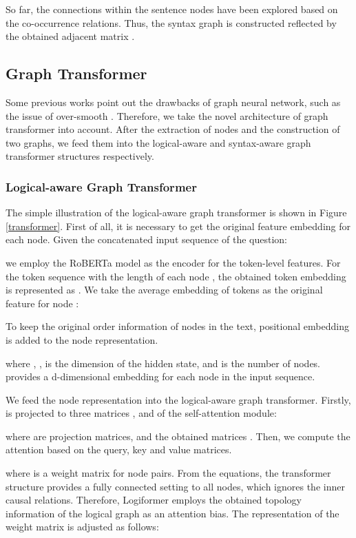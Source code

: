 \documentclass[sigconf]{acmart}
\begin{document}
So far, the connections within the sentence nodes have been explored based on the co-occurrence relations. Thus, the syntax graph is constructed reflected by the obtained adjacent matrix .

\subsection{Graph Transformer}
Some previous works \cite{zhang2020graph, dwivedi2020generalization} point out the drawbacks of graph neural network, such as the issue of over-smooth \cite{li2018deeper}. Therefore, we take the novel architecture of graph transformer \cite{ying2021transformers, cai2020graph} into account. After the extraction of nodes and the construction of two graphs, we feed them into the logical-aware and syntax-aware graph transformer structures respectively. 

\subsubsection{\textbf{Logical-aware Graph Transformer}}
The simple illustration of the logical-aware graph transformer is shown in Figure \ref{transformer}. First of all, it is necessary to get the original feature embedding for each node. Given the concatenated input sequence of the  question:


we employ the RoBERTa model \cite{liu2019roberta} as the encoder for the token-level features. For the token sequence  with the length  of each node , the obtained token embedding is represented as . We take the average embedding of  tokens as the original feature for node :



To keep the original order information of nodes in the text, positional embedding is added to the node representation.


where , ,  is the dimension of the hidden state, and  is the number of nodes.  provides a d-dimensional embedding for each node in the input sequence.

We feed the node representation  into the logical-aware graph transformer. Firstly,  is projected to three matrices ,  and  of the self-attention module:


where  are projection matrices, and the obtained matrices . Then, we compute the attention based on the query, key and value matrices.


where  is a weight matrix for node 
pairs. From the equations, the transformer structure provides a fully connected 
setting to all nodes, which ignores the inner causal relations. Therefore, 
Logiformer employs the obtained topology information  of the logical graph as an attention bias. 
The representation of the weight matrix  is adjusted as follows:
\end{document}
